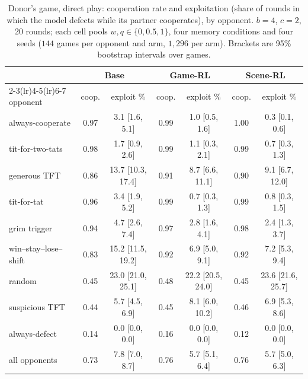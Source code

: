 
\begin{table}[t]
\centering\small
\caption{Donor's game, direct play: cooperation rate and exploitation (share of rounds in which the model defects while its partner cooperates), by opponent. $b=4$, $c=2$, 20 rounds; each cell pools $w,q\in\{0,0.5,1\}$, four memory conditions and four seeds ($144$ games per opponent and arm, $1{,}296$ per arm). Brackets are 95\% bootstrap intervals over games.}
\label{tab:donors-exploit}
\begin{tabular}{@{}l cc cc cc@{}}
\toprule
& \multicolumn{2}{c}{Base} & \multicolumn{2}{c}{Game-RL} & \multicolumn{2}{c}{Scene-RL} \\
\cmidrule(lr){2-3}\cmidrule(lr){4-5}\cmidrule(lr){6-7}
opponent & coop. & exploit \% & coop. & exploit \% & coop. & exploit \% \\
\midrule
always-cooperate & 0.97 & 3.1 [1.6, 5.1] & 0.99 & 1.0 [0.5, 1.6] & 1.00 & 0.3 [0.1, 0.6] \\
tit-for-two-tats & 0.98 & 1.7 [0.9, 2.6] & 0.99 & 1.1 [0.3, 2.1] & 0.99 & 0.7 [0.3, 1.3] \\
generous TFT & 0.86 & 13.7 [10.3, 17.4] & 0.91 & 8.7 [6.6, 11.1] & 0.90 & 9.1 [6.7, 12.0] \\
tit-for-tat & 0.96 & 3.4 [1.9, 5.2] & 0.99 & 0.7 [0.3, 1.3] & 0.99 & 0.8 [0.3, 1.5] \\
grim trigger & 0.94 & 4.7 [2.6, 7.4] & 0.97 & 2.8 [1.6, 4.1] & 0.98 & 2.4 [1.3, 3.7] \\
win--stay--lose--shift & 0.83 & 15.2 [11.5, 19.2] & 0.92 & 6.9 [5.0, 9.1] & 0.92 & 7.2 [5.3, 9.4] \\
random & 0.45 & 23.0 [21.0, 25.1] & 0.48 & 22.2 [20.5, 24.0] & 0.45 & 23.6 [21.6, 25.7] \\
suspicious TFT & 0.44 & 5.7 [4.5, 6.9] & 0.45 & 8.1 [6.0, 10.2] & 0.46 & 6.9 [5.3, 8.6] \\
always-defect & 0.14 & 0.0 [0.0, 0.0] & 0.16 & 0.0 [0.0, 0.0] & 0.12 & 0.0 [0.0, 0.0] \\
\midrule all opponents & 0.73 & 7.8 [7.0, 8.7] & 0.76 & 5.7 [5.1, 6.4] & 0.76 & 5.7 [5.0, 6.3] \\
\bottomrule
\end{tabular}
\end{table}

